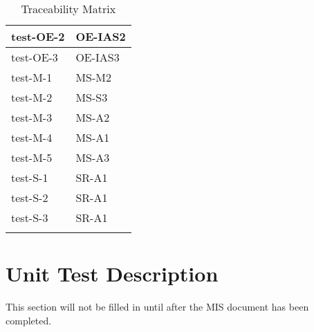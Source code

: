 \documentclass[12pt, titlepage]{article}
\begin{document}
\begin{center}
\begin{longtable}{|>{\centering\arraybackslash}p{4cm}|>{\centering\arraybackslash}p{10cm}|}
  \hline
  test-OE-2 & OE-IAS2 \\
  \hline
  test-OE-3 & OE-IAS3 \\
  \hline
  test-M-1 & MS-M2 \\
  \hline
  test-M-2 & MS-S3 \\
  \hline
  test-M-3 & MS-A2 \\
  \hline
  test-M-4 & MS-A1 \\
  \hline
  test-M-5 & MS-A3 \\
  \hline
  test-S-1 & SR-A1 \\
  \hline
  test-S-2 & SR-A1 \\
  \hline
  test-S-3 & SR-A1 \\
  \hline

  \caption{Traceability Matrix}
  \end{longtable}
  \end{center}


\section{Unit Test Description}
This section will not be filled in until after the MIS document has been completed.




\end{document}
